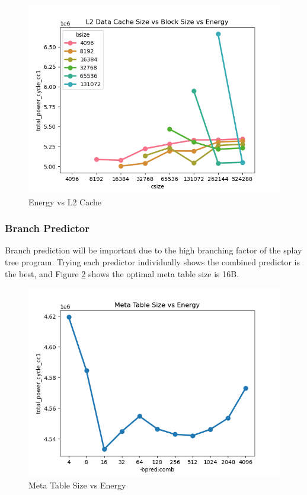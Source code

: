 \documentclass{article}
\begin{document}
\begin{multicols}{2}
  \begin{figure}[H]
    \centering
    \includegraphics[width=\linewidth]{./assets/l2_vs_energy.png}
    \caption{Energy vs L2 Cache}
    \label{fig:l2_vs_energy}
  \end{figure}

  \subsubsection{Branch Predictor}
  Branch prediction will be important due to the high branching factor of the splay tree program. Trying each predictor individually shows the combined predictor is the best, and Figure \ref{fig:meta_table_vs_energy} shows the optimal meta table size is 16B.

  \begin{figure}[H]
    \centering
    \includegraphics[width=\linewidth]{./assets/meta_table_vs_energy.png}
    \caption{Meta Table Size vs Energy}
    \label{fig:meta_table_vs_energy}
  \end{figure}


\end{multicols}
\end{document}
